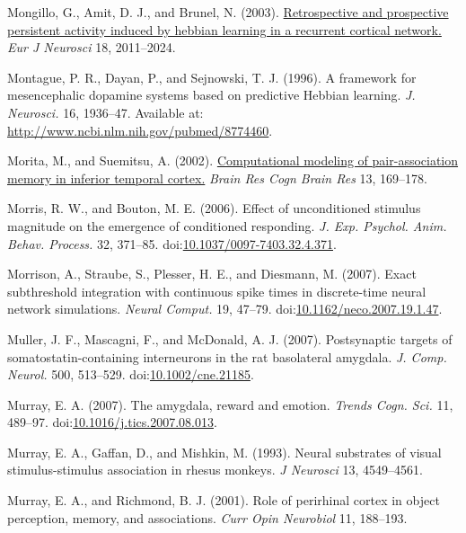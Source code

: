 \documentclass[
  11pt,
  a4paper,
]{scrbook}
\newlength{\cslhangindent}
\newenvironment{CSLReferences}[2] %
 {\begin{list}{}{%
  \setlength{\itemindent}{0pt}
  \setlength{\leftmargin}{0pt}
  \setlength{\parsep}{0pt}
  \ifodd #1
   \setlength{\leftmargin}{\cslhangindent}
   \setlength{\itemindent}{-1\cslhangindent}
  \fi
  \setlength{\itemsep}{#2\baselineskip}}}
 {\end{list}}
\begin{document}
\begin{CSLReferences}{1}{1}
Mongillo, G., Amit, D. J., and Brunel, N. (2003).
\href{https://www.ncbi.nlm.nih.gov/pubmed/14622234}{Retrospective and
prospective persistent activity induced by hebbian learning in a
recurrent cortical network.} \emph{Eur J Neurosci} 18, 2011--2024.

Montague, P. R., Dayan, P., and Sejnowski, T. J. (1996). {A framework
for mesencephalic dopamine systems based on predictive Hebbian
learning.} \emph{J. Neurosci.} 16, 1936--47. Available at:
\url{http://www.ncbi.nlm.nih.gov/pubmed/8774460}.

Morita, M., and Suemitsu, A. (2002).
\href{https://www.ncbi.nlm.nih.gov/pubmed/11958959}{Computational
modeling of pair-association memory in inferior temporal cortex.}
\emph{Brain Res Cogn Brain Res} 13, 169--178.

Morris, R. W., and Bouton, M. E. (2006). {Effect of unconditioned
stimulus magnitude on the emergence of conditioned responding.} \emph{J.
Exp. Psychol. Anim. Behav. Process.} 32, 371--85.
doi:\href{https://doi.org/10.1037/0097-7403.32.4.371}{10.1037/0097-7403.32.4.371}.

Morrison, A., Straube, S., Plesser, H. E., and Diesmann, M. (2007).
{Exact subthreshold integration with continuous spike times in
discrete-time neural network simulations.} \emph{Neural Comput.} 19,
47--79.
doi:\href{https://doi.org/10.1162/neco.2007.19.1.47}{10.1162/neco.2007.19.1.47}.

Muller, J. F., Mascagni, F., and McDonald, A. J. (2007). {Postsynaptic
targets of somatostatin-containing interneurons in the rat basolateral
amygdala}. \emph{J. Comp. Neurol.} 500, 513--529.
doi:\href{https://doi.org/10.1002/cne.21185}{10.1002/cne.21185}.

Murray, E. A. (2007). {The amygdala, reward and emotion.} \emph{Trends
Cogn. Sci.} 11, 489--97.
doi:\href{https://doi.org/10.1016/j.tics.2007.08.013}{10.1016/j.tics.2007.08.013}.

Murray, E. A., Gaffan, D., and Mishkin, M. (1993). Neural substrates of
visual stimulus-stimulus association in rhesus monkeys. \emph{J
Neurosci} 13, 4549--4561.

Murray, E. A., and Richmond, B. J. (2001). Role of perirhinal cortex in
object perception, memory, and associations. \emph{Curr Opin Neurobiol}
11, 188--193.


\end{CSLReferences}
\end{document}
